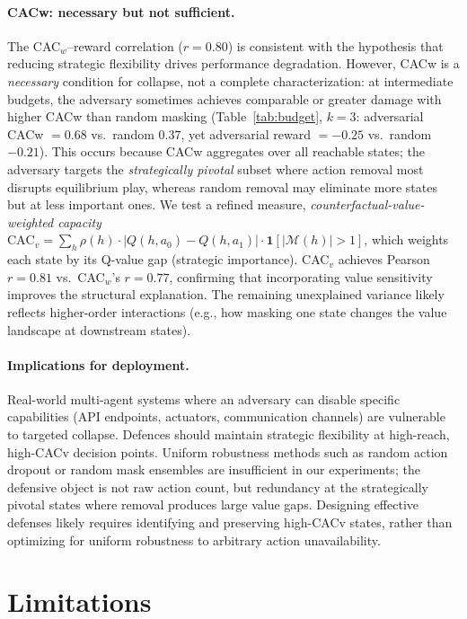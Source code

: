 \documentclass{article}
\begin{document}
\paragraph{CACw: necessary but not sufficient.}
The CAC$_w$--reward correlation ($r = 0.80$) is consistent with the hypothesis that reducing strategic flexibility drives performance degradation. However, CACw is a \emph{necessary} condition for collapse, not a complete characterization: at intermediate budgets, the adversary sometimes achieves comparable or greater damage with higher CACw than random masking (Table~\ref{tab:budget}, $k{=}3$: adversarial CACw $= 0.68$ vs.\ random $0.37$, yet adversarial reward $= -0.25$ vs.\ random $-0.21$). This occurs because CACw aggregates over all reachable states; the adversary targets the \emph{strategically pivotal} subset where action removal most disrupts equilibrium play, whereas random removal may eliminate more states but at less important ones. We test a refined measure, \emph{counterfactual-value-weighted capacity} $\text{CAC}_v = \sum_h \rho(h) \cdot |Q(h,a_0) - Q(h,a_1)| \cdot \mathbf{1}[|\mathcal{M}(h)| > 1]$, which weights each state by its Q-value gap (strategic importance). CAC$_v$ achieves Pearson $r = 0.81$ vs.\ CAC$_w$'s $r = 0.77$, confirming that incorporating value sensitivity improves the structural explanation. The remaining unexplained variance likely reflects higher-order interactions (e.g., how masking one state changes the value landscape at downstream states).

\paragraph{Implications for deployment.}
Real-world multi-agent systems where an adversary can disable specific capabilities (API endpoints, actuators, communication channels) are vulnerable to targeted collapse. Defences should maintain strategic flexibility at high-reach, high-CACv decision points. Uniform robustness methods such as random action dropout or random mask ensembles are insufficient in our experiments; the defensive object is not raw action count, but redundancy at the strategically pivotal states where removal produces large value gaps. Designing effective defenses likely requires identifying and preserving high-CACv states, rather than optimizing for uniform robustness to arbitrary action unavailability.

\section{Limitations}
\end{document}
